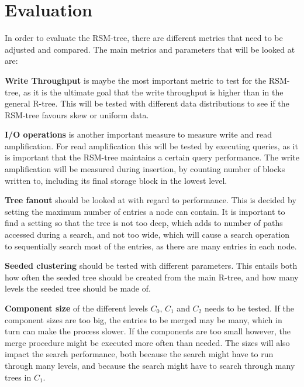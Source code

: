 \section{Evaluation}
In order to evaluate the RSM-tree, there are different metrics that need to be adjusted and compared. The main metrics and parameters that will be looked at are:\newline

\noindent
\textbf{Write Throughput} is maybe the most important metric to test for the RSM-tree, as it is the ultimate goal that the write throughput is higher than in the general R-tree. This will be tested with different data distributions to see if the RSM-tree favours skew or uniform data. \newline

\noindent
\textbf{I/O operations} is another important measure to measure write and read amplification. For read amplification this will be tested by executing queries, as it is important that the RSM-tree maintains a certain query performance. The write amplification will be measured during insertion, by counting number of blocks written to, including its final storage block in the lowest level. \newline

\noindent
\textbf{Tree fanout} should be looked at with regard to performance. This is decided by setting the maximum number of entries a node can contain. It is important to find a setting so that the tree is not too deep, which adds to number of paths accessed during a search, and not too wide, which will cause a search operation to sequentially search most of the entries, as there are many entries in each node. \newline

\noindent
\textbf{Seeded clustering} should be tested with different parameters. This entails both how often the seeded tree should be created from the main R-tree, and how many levels the seeded tree should be made of. \newline

\noindent
\textbf{Component size} of the different levels $C_0$, $C_1$ and $C_2$ needs to be tested. If the component sizes are too big, the entries to be merged may be many, which in turn can make the process slower. If the components are too small however, the merge procedure might be executed more often than needed. The sizes will also impact the search performance, both because the search might have to run through many levels, and because the search might have to search through many trees in $C_1$.\newline

